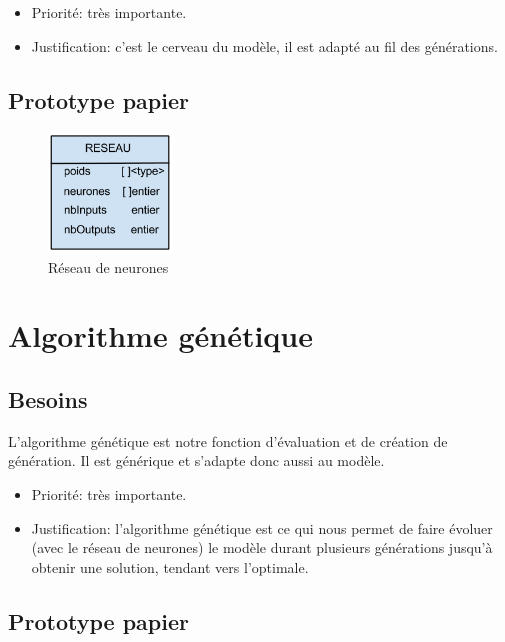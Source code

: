 \begin{itemize}
 \item Priorité: très importante.
 \item Justification: c'est le cerveau du modèle, il est adapté au fil des générations.\\
\end{itemize}



\subsection{Prototype papier}

\begin{figure}[H]
    \centering
    \includegraphics[width=0.3\textwidth]{./pictures/reseau.png}
    \caption{Réseau de neurones}
\end{figure}

\section{Algorithme génétique}
\subsection{Besoins}
L'algorithme génétique est notre fonction d'évaluation et de création de génération. Il est générique et s'adapte donc aussi au modèle.

\begin{itemize}
 \item Priorité: très importante.
 \item Justification: l'algorithme génétique est ce qui nous permet de faire évoluer (avec le réseau de neurones) le modèle durant plusieurs générations jusqu'à obtenir une solution, tendant vers l'optimale.\\
\end{itemize}
\subsection{Prototype papier}

